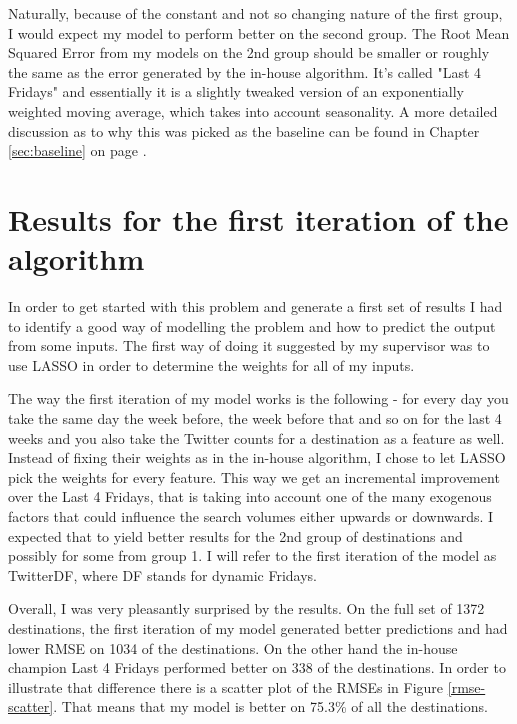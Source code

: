 \documentclass[minf,frontabs,twoside,singlespacing,parskip]{infthesis}
\begin{document}
Naturally, because of the constant and not so changing nature of the first group, I would expect my model to perform better on the second group. The Root Mean Squared Error from my models on the 2nd group should be smaller or roughly the same as the error generated by the in-house algorithm. It's called  "Last 4 Fridays" and essentially it is a slightly tweaked version of an exponentially weighted moving average, which takes into account seasonality. A more detailed discussion as to why this was picked as the baseline can be found in Chapter \ref{sec:baseline} on page \pageref{sec:baseline}.


\section{Results for the first iteration of the algorithm}


In order to get started with this problem and generate a first set of results I had to identify a good way of modelling the problem and how to predict the output from some inputs. The first way of doing it suggested by my supervisor was to use LASSO \cite{lasso} in order to determine the weights for all of my inputs. 


The way the first iteration of my model works is the following - for every day you take the same day the week before, the week before that and so on for the last 4 weeks and you also take the Twitter counts for a destination as a feature as well. Instead of fixing their weights as in the in-house algorithm, I chose to let LASSO pick the weights for every feature. This way we get an incremental improvement over the Last 4 Fridays, that is taking into account one of the many exogenous factors that could influence the search volumes either upwards or downwards. I expected that to yield better results for the 2nd group of destinations and possibly for some from group 1. I will refer to the first iteration of the model as TwitterDF, where DF stands for dynamic Fridays. 


Overall, I was very pleasantly surprised by the results. On the full set of 1372 destinations, the first iteration of my model generated better predictions and had lower RMSE on 1034 of the destinations. On the other hand the in-house champion Last 4 Fridays performed better on 338 of the destinations. In order to illustrate that difference there is a scatter plot of the RMSEs in Figure \ref{rmse-scatter}. That means that my model is better on 75.3\% of all the destinations.
\end{document}

